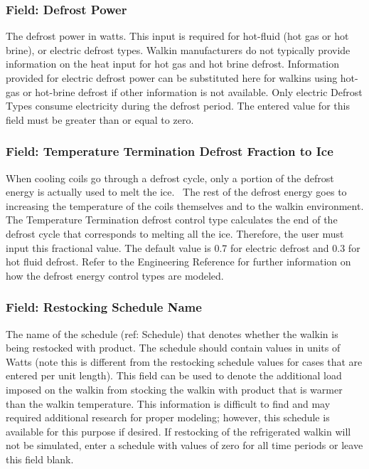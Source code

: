 \subsubsection{Field: Defrost Power}\label{field-defrost-power}

The defrost power in watts. This input is required for hot-fluid (hot gas or hot brine), or electric defrost types. Walkin manufacturers do not typically provide information on the heat input for hot gas and hot brine defrost. Information provided for electric defrost power can be substituted here for walkins using hot-gas or hot-brine defrost if other information is not available. Only electric Defrost Types consume electricity during the defrost period. The entered value for this field must be greater than or equal to zero.

\subsubsection{Field: Temperature Termination Defrost Fraction to Ice}\label{field-temperature-termination-defrost-fraction-to-ice}

When cooling coils go through a defrost cycle, only a portion of the defrost energy is actually used to melt the ice.~ The rest of the defrost energy goes to increasing the temperature of the coils themselves and to the walkin environment. The Temperature Termination defrost control type calculates the end of the defrost cycle that corresponds to melting all the ice. Therefore, the user must input this fractional value. The default value is 0.7 for electric defrost and 0.3 for hot fluid defrost. Refer to the Engineering Reference for further information on how the defrost energy control types are modeled.

\subsubsection{Field: Restocking Schedule Name}\label{field-restocking-schedule-name}

The name of the schedule (ref: Schedule) that denotes whether the walkin is being restocked with product. The schedule should contain values in units of Watts (note this is different from the restocking schedule values for cases that are entered per unit length). This field can be used to denote the additional load imposed on the walkin from stocking the walkin with product that is warmer than the walkin temperature. This information is difficult to find and may required additional research for proper modeling; however, this schedule is available for this purpose if desired. If restocking of the refrigerated walkin will not be simulated, enter a schedule with values of zero for all time periods or leave this field blank.

